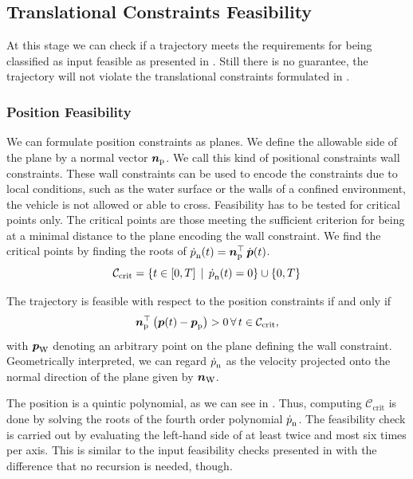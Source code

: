 \subsection{Translational Constraints Feasibility}
At this stage we can check if a trajectory meets the requirements for being classified as input feasible as presented in . Still there is no guarantee, the trajectory will not violate the translational constraints formulated in .

\subsubsection{Position Feasibility}
\label{sec:position-feasibility}
We can formulate position constraints as planes. We define the allowable side of the plane by a normal vector $\mbox{$\bm{n}$}_{\text{p}}$. We call this kind of positional constraints wall constraints. These wall constraints can be used to encode the constraints due to local conditions, such as the water surface or the walls of a confined environment, the vehicle is not allowed or able to cross. Feasibility has to be tested for critical points only. The critical points are those meeting the sufficient criterion for being at a minimal distance to the plane encoding the wall constraint. We find the critical points by finding the roots of $\mbox{$\dot{p}$}_{\text{n}}(t) = \mbox{$\bm{n}$}_{\text{p}}^\top \, \mbox{$\dot{\bm{p}}$}(t)$.
\begin{equation}
	\mathcal{C}_{\text{crit}} =
	\left\{
		t \in \left[ 0, T \right]
		\,\mid\, \mbox{$\dot{p}$}_{\text{n}}(t) = 0
	\right\}
	\cup
	\left\{0,T\right\}
\end{equation}

The trajectory is feasible with respect to the position constraints if and only if
\begin{equation}
	\label{eq:position-feasibility-criterion}
	\mbox{$\bm{n}$}_\text{p}^\top
	\left(
		\mbox{$\bm{p}$}(t) - \mbox{$\bm{p}$}_{\text{p}}
	\right)
	> 0
	\,\forall\, t \in \mathcal{C}_{\text{crit}}
	,
\end{equation}
with $\mbox{$\bm{p}$}_{\text{W}}$ denoting an arbitrary point on the plane defining the wall constraint. Geometrically interpreted, we can regard $\mbox{$\dot{p}$}_{\text{n}}$ as the velocity projected onto the normal direction of the plane given by $\mbox{$\bm{n}$}_{\text{W}}$.

The position is a quintic polynomial, as we can see in . Thus, computing $\mathcal{C}_{\text{crit}}$ is done by solving the roots of the fourth order polynomial $\mbox{$\dot{p}$}_{\text{n}}$. The feasibility check is carried out by evaluating the left-hand side of  at least twice and most six times per axis. This is similar to the input feasibility checks presented in  with the difference that no recursion is needed, though.

